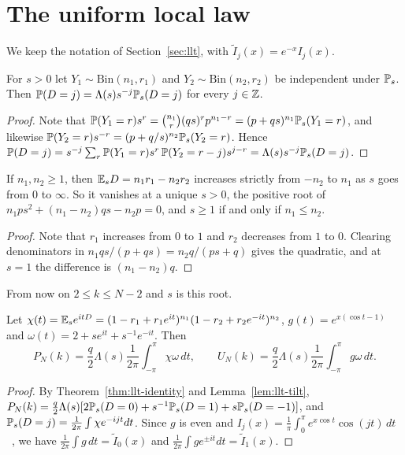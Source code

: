 \section{The uniform local law}\label{app:llt}

We keep the notation of Section~\ref{sec:llt}, with $\tilde I_j(x)=e^{-x}I_j(x)$.

\begin{lemma}[tilting]\label{lem:llt-tilt}
For $s>0$ let $Y_1\sim\mathrm{Bin}(n_1,r_1)$ and $Y_2\sim\mathrm{Bin}(n_2,r_2)$ be independent
under $\mathbb{P}_s$. Then $\mathbb{P}(D=j)=\Lambda(s)s^{-j}\mathbb{P}_s(D=j)$ for every $j\in\mathbb{Z}$.
\end{lemma}

\begin{proof}
Note that $\mathbb{P}(Y_1=r)s^r=\binom{n_1}r(qs)^rp^{n_1-r}=(p+qs)^{n_1}\mathbb{P}_s(Y_1=r)$, and
likewise $\mathbb{P}(Y_2=r)s^{-r}=(p+q/s)^{n_2}\mathbb{P}_s(Y_2=r)$. Hence
$\mathbb{P}(D=j)=s^{-j}\sum_r\mathbb{P}(Y_1=r)s^r\,\mathbb{P}(Y_2=r-j)s^{j-r}=\Lambda(s)s^{-j}\mathbb{P}_s(D=j)$.
\end{proof}

\begin{lemma}[saddle]\label{lem:llt-saddle}
If $n_1,n_2\ge1$, then $\mathbb{E}_sD=n_1r_1-n_2r_2$ increases strictly from $-n_2$ to $n_1$ as $s$ goes
from $0$ to $\infty$. So it vanishes at a unique $s>0$, the positive root of
$n_1ps^2+(n_1-n_2)qs-n_2p=0$, and $s\ge1$ if and only if $n_1\le n_2$.
\end{lemma}

\begin{proof}
Note that $r_1$ increases from $0$ to $1$ and $r_2$ decreases from $1$ to $0$. Clearing
denominators in $n_1qs/(p+qs)=n_2q/(ps+q)$ gives the quadratic, and at $s=1$ the difference is
$(n_1-n_2)q$.
\end{proof}

From now on $2\le k\le N-2$ and $s$ is this root.

\begin{lemma}\label{lem:llt-fourier}
Let $\chi(t)=\mathbb{E}_se^{itD}=(1-r_1+r_1e^{it})^{n_1}(1-r_2+r_2e^{-it})^{n_2}$,
$g(t)=e^{x(\cos t-1)}$ and $\omega(t)=2+se^{it}+s^{-1}e^{-it}$. Then
\[
P_N(k)=\frac q2\Lambda(s)\frac1{2\pi}\int_{-\pi}^{\pi}\chi\omega\,dt,\qquad
U_N(k)=\frac q2\Lambda(s)\frac1{2\pi}\int_{-\pi}^{\pi}g\omega\,dt.
\]
\end{lemma}

\begin{proof}
By Theorem~\ref{thm:llt-identity} and Lemma~\ref{lem:llt-tilt},
$P_N(k)=\frac q2\Lambda(s)[2\mathbb{P}_s(D=0)+s^{-1}\mathbb{P}_s(D=1)+s\mathbb{P}_s(D=-1)]$, and
$\mathbb{P}_s(D=j)=\frac1{2\pi}\int\chi e^{-ijt}dt$. Since $g$ is even and
$I_j(x)=\frac1\pi\int_0^\pi e^{x\cos t}\cos(jt)\,dt$~\cite[Eq.~10.32.3]{dlmf}, we have
$\frac1{2\pi}\int g\,dt=\tilde I_0(x)$ and $\frac1{2\pi}\int ge^{\pm it}dt=\tilde I_1(x)$.
\end{proof}

